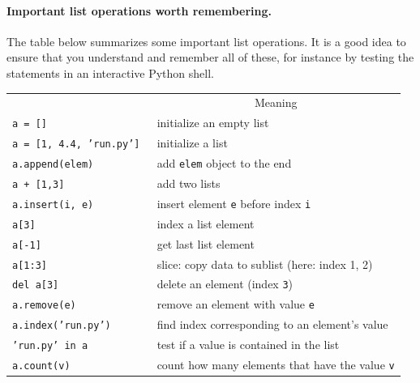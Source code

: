 \documentclass[graybox,envcountchap,sectrefs,final]{svmonodo}
\begin{document}
\paragraph{Important list operations worth remembering.}
The table below summarizes some important list operations. It is a good idea to ensure that you understand and remember
all of these, for instance by testing the statements in an interactive Python shell.
{\footnotesize



{\small   %

\vspace{4mm}

\begin{tabular}{ll}
\hline\noalign{\smallskip}
\multicolumn{1}{c}{ Construction } & \multicolumn{1}{c}{ Meaning } \\
\noalign{\smallskip}\svhline\noalign{\smallskip}
\texttt{a = [] }                 & initialize an empty list                             \\
\texttt{a = [1, 4.4, 'run.py'] } & initialize a list                                    \\
\texttt{a.append(elem)}          & add \texttt{elem} object to the end                    \\
\texttt{a + [1,3]}               & add two lists                                        \\
\texttt{a.insert(i, e)}          & insert element \texttt{e} before index \texttt{i}        \\
\texttt{a[3]}                    & index a list element                                 \\
\texttt{a[-1]}                   & get last list element                                \\
\texttt{a[1:3]}                  & slice: copy data to sublist (here: index 1, 2)       \\
\texttt{del a[3]}                & delete an element (index \texttt{3})                   \\
\texttt{a.remove(e)}             & remove an element with value \texttt{e}                \\
\texttt{a.index('run.py')}       & find index corresponding to an element's value       \\
\texttt{'run.py' in a}           & test if a value is contained in the list             \\
\texttt{a.count(v)}              & count how many elements that have the value \texttt{v} \\

\end{tabular}}}
\end{document}
